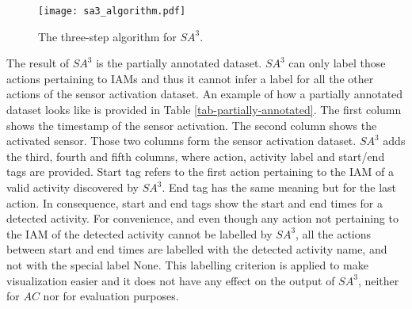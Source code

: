 \begin{figure}[htbp]
\centering
\texttt{[image: sa3\_algorithm.pdf]}
    \caption{The three-step algorithm for $SA^3$.}
    \label{fig:sa3_algorithm}
\end{figure}

The result of $SA^3$ is the partially annotated dataset. $SA^3$ can only label those actions pertaining to IAMs and thus it cannot infer a label for all the other actions of the sensor activation dataset. An example of how a partially annotated dataset looks like is provided in Table \ref{tab-partially-annotated}. The first column shows the timestamp of the sensor activation. The second column shows the activated sensor. Those two columns form the sensor activation dataset. $SA^3$ adds the third, fourth and fifth columns, where action, activity label and start/end tags are provided. Start tag refers to the first action pertaining to the IAM of a valid activity discovered by $SA^3$. End tag has the same meaning but for the last action. In consequence, start and end tags show the start and end times for a detected activity. For convenience, and even though any action not pertaining to the IAM of the detected activity cannot be labelled by $SA^3$, all the actions between start and end times are labelled with the detected activity name, and not with the special label None. This labelling criterion is applied to make visualization easier and it does not have any effect on the output of $SA^3$, neither for $AC$ nor for evaluation purposes.

\begin{comment}
\begin{figure}[htbp]
\begin{scriptsize}
\begin{lstlisting}
2014-05-23 07:42:17.106962,wsugarSens,hasFlavour,None,
2014-05-23 07:49:17.310460,bedSens,useFurniture,None,
2014-05-23 09:43:44.128079,cupSens,hasContainer,MakeChocolate,start
2014-05-23 09:47:33.984341,storeSens,openStore,MakeChocolate,
2014-05-23 09:47:39.333528,potSens,useCookingUtensil,MakeChocolate,
2014-05-23 09:47:52.750216,cookerSens,useCookingAppliance,MakeChocolate,
2014-05-23 09:48:07.764138,fridgeSens,openFridge,MakeChocolate,
2014-05-23 09:48:12.591836,wmilkSens,hasMilk,MakeChocolate,
2014-05-23 09:48:47.199512,chocoSens,hasChocolate,MakeChocolate,end
2014-05-23 09:54:11.553695,mugSens,hasContainer,None,
\end{lstlisting}
\end{scriptsize}
\caption{Example of a partially annotated dataset, the output of the $SA^3$ algorithm.}
\label{fig-partially-annotated}
\end{figure}
\end{comment}

